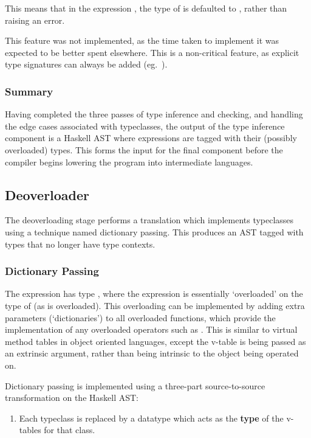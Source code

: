 \documentclass[dissertation.tex]{subfiles}
\begin{document}
{{{            This means that in the expression , the type of  is defaulted to , rather than raising an error.

            This feature was not implemented, as the time taken to implement it was expected to be better spent elsewhere. This is a non-critical feature, as explicit type signatures can always be added (eg.\ ).
        }
        \subsubsection*{Summary}
        {
            Having completed the three passes of type inference and checking, and handling the edge cases associated with typeclasses, the output of the type inference component is a Haskell AST where expressions are tagged with their (possibly overloaded) types. This forms the input for the final component before the compiler begins lowering the program into intermediate languages.   
        }
    }
    \subsection{Deoverloader}\label{sec:deoverloading}
    {
        The deoverloading stage performs a translation which implements typeclasses using a technique named dictionary passing. This produces an AST tagged with types that no longer have type contexts.

        \subsubsection{Dictionary Passing}
        {
            The expression  has type , where the expression is essentially `overloaded' on the type of  (as \haskell{(+)} is overloaded). This overloading can be implemented by adding extra parameters (`dictionaries') to all overloaded functions, which provide the implementation of any overloaded operators such as \haskell{(+)}. This is similar to virtual method tables in object oriented languages, except the v-table is being passed as an extrinsic argument, rather than being intrinsic to the object being operated on.

            Dictionary passing is implemented using a three-part source-to-source transformation on the Haskell AST:
            
            \begin{enumerate}
            \item
            {
                Each typeclass is replaced by a datatype which acts as the \textbf{type} of the v-tables for that class.

}
\end{enumerate}}}}
\end{document}
